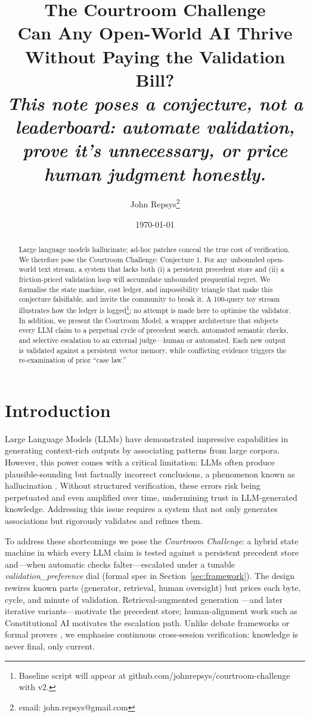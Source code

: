 \documentclass[11pt]{article}
\title{The Courtroom Challenge\\\large Can Any Open-World AI Thrive Without Paying the Validation Bill?\\[1em]\small\textit{This note poses a conjecture, not a leaderboard: automate validation, prove it's unnecessary, or price human judgment honestly.}}
\author{John Repsys\thanks{email: john.repsys@gmail.com}}
\date{\today}
\begin{document}
\maketitle
\begin{abstract}
  Large language models hallucinate; ad-hoc patches conceal the true cost of verification. We therefore pose the Courtroom Challenge:
  Conjecture 1. For any unbounded open-world text stream, a system that lacks both (i) a persistent precedent store and (ii) a friction-priced validation loop will accumulate unbounded prequential regret.
  We formalise the state machine, cost ledger, and impossibility triangle that make this conjecture falsifiable, and invite the community to break it. A 100-query toy stream illustrates how the ledger is logged\footnote{Baseline script will appear at github.com/johnrepsys/courtroom-challenge with v2.}; no attempt is made here to optimise the validator. In addition, we present the Courtroom Model, a wrapper architecture that subjects every LLM claim to a perpetual cycle of precedent search, automated semantic checks, and selective escalation to an external judge—human or automated. Each new output is validated against a persistent vector memory, while conflicting evidence triggers the re-examination of prior “case law.”
\end{abstract}

\section{Introduction}
\label{sec:intro}
Large Language Models (LLMs) have demonstrated impressive capabilities in generating context-rich outputs by associating patterns from large corpora. However, this power comes with a critical limitation: LLMs often produce plausible-sounding but factually incorrect conclusions, a phenomenon known as hallucination \citep{marcus2020nextdecade,shinn2023reflexion}. Without structured verification, these errors risk being perpetuated and even amplified over time, undermining trust in LLM-generated knowledge. Addressing this issue requires a system that not only generates associations but rigorously validates and refines them.

To address these shortcomings we pose the \textit{Courtroom Challenge}: a
hybrid state machine in which every LLM claim is tested against a persistent
precedent store and—when automatic checks falter—escalated under a
tunable \textit{validation\_preference} dial (formal spec in
Section~\ref{sec:framework}).  The design rewires known parts
(generator, retrieval, human oversight) but prices each byte, cycle,
and minute of validation.  Retrieval-augmented generation \citep{lewis2020rag,
fan2024ragsurvey}—and later iterative variants—motivate the precedent
store; human-alignment work such as Constitutional AI
\citep{bai2022constitutional} motivates the escalation path.
Unlike debate frameworks \citep{chen2024reconcile,madaan2023selfrefine} or formal
provers \citep{wang2025malot}, we emphasise continuous cross-session
verification: knowledge is never final, only current.
\end{document}
